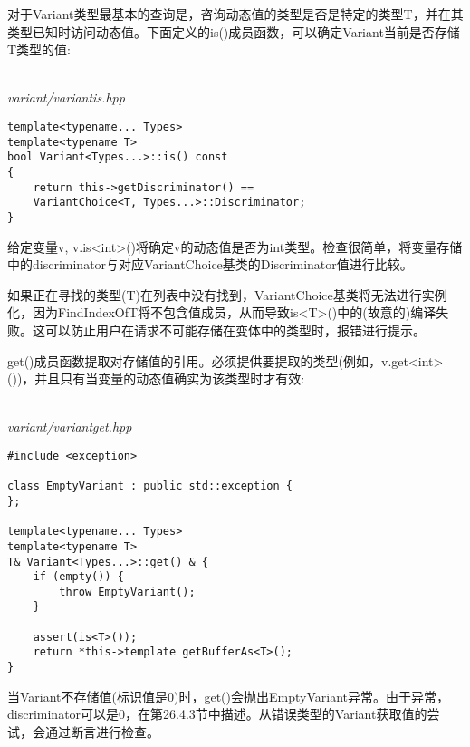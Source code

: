 对于Variant类型最基本的查询是，咨询动态值的类型是否是特定的类型T，并在其类型已知时访问动态值。下面定义的is()成员函数，可以确定Variant当前是否存储T类型的值:

\hspace*{\fill} \\ %
\noindent
\textit{variant/variantis.hpp}
\begin{lstlisting}[style=styleCXX]
template<typename... Types>
template<typename T>
bool Variant<Types...>::is() const
{
	return this->getDiscriminator() ==
	VariantChoice<T, Types...>::Discriminator;
}
\end{lstlisting}

给定变量v, v.is<int>()将确定v的动态值是否为int类型。检查很简单，将变量存储中的discriminator与对应VariantChoice基类的Discriminator值进行比较。

如果正在寻找的类型(T)在列表中没有找到，VariantChoice基类将无法进行实例化，因为FindIndexOfT将不包含值成员，从而导致is<T>()中的(故意的)编译失败。这可以防止用户在请求不可能存储在变体中的类型时，报错进行提示。

get()成员函数提取对存储值的引用。必须提供要提取的类型(例如，v.get<int>())，并且只有当变量的动态值确实为该类型时才有效:

\hspace*{\fill} \\ %
\noindent
\textit{variant/variantget.hpp}
\begin{lstlisting}[style=styleCXX]
#include <exception>

class EmptyVariant : public std::exception {
};

template<typename... Types>
template<typename T>
T& Variant<Types...>::get() & {
	if (empty()) {
		throw EmptyVariant();
	}

	assert(is<T>());
	return *this->template getBufferAs<T>();
}
\end{lstlisting}

当Variant不存储值(标识值是0)时，get()会抛出EmptyVariant异常。由于异常，discriminator可以是0，在第26.4.3节中描述。从错误类型的Variant获取值的尝试，会通过断言进行检查。














































